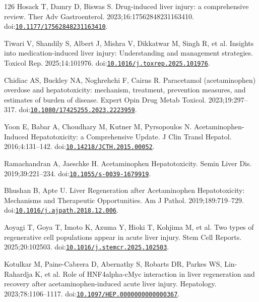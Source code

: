 \begingroup
\fontsize{8.6}{10.5}\selectfont
\begin{thebibliography}{126}
Hosack T, Damry D, Biswas S. Drug-induced liver injury: a comprehensive review. Ther Adv Gastroenterol. 2023;16:17562848231163410. doi:\href{https://doi.org/10.1177/17562848231163410}{\nolinkurl{10.1177/17562848231163410}}.

Tiwari V, Shandily S, Albert J, Mishra V, Dikkatwar M, Singh R, et al. Insights into medication-induced liver injury: Understanding and management strategies. Toxicol Rep. 2025;14:101976. doi:\href{https://doi.org/10.1016/j.toxrep.2025.101976}{\nolinkurl{10.1016/j.toxrep.2025.101976}}.

Chidiac AS, Buckley NA, Noghrehchi F, Cairns R. Paracetamol (acetaminophen) overdose and hepatotoxicity: mechanism, treatment, prevention measures, and estimates of burden of disease. Expert Opin Drug Metab Toxicol. 2023;19:297--317. doi:\href{https://doi.org/10.1080/17425255.2023.2223959}{\nolinkurl{10.1080/17425255.2023.2223959}}.

Yoon E, Babar A, Choudhary M, Kutner M, Pyrsopoulos N. Acetaminophen-Induced Hepatotoxicity: a Comprehensive Update. J Clin Transl Hepatol. 2016;4:131--142. doi:\href{https://doi.org/10.14218/JCTH.2015.00052}{\nolinkurl{10.14218/JCTH.2015.00052}}.

Ramachandran A, Jaeschke H. Acetaminophen Hepatotoxicity. Semin Liver Dis. 2019;39:221--234. doi:\href{https://doi.org/10.1055/s-0039-1679919}{\nolinkurl{10.1055/s-0039-1679919}}.

Bhushan B, Apte U. Liver Regeneration after Acetaminophen Hepatotoxicity: Mechanisms and Therapeutic Opportunities. Am J Pathol. 2019;189:719--729. doi:\href{https://doi.org/10.1016/j.ajpath.2018.12.006}{\nolinkurl{10.1016/j.ajpath.2018.12.006}}.

Aoyagi T, Goya T, Imoto K, Azuma Y, Hioki T, Kohjima M, et al. Two types of regenerative cell populations appear in acute liver injury. Stem Cell Reports. 2025;20:102503. doi:\href{https://doi.org/10.1016/j.stemcr.2025.102503}{\nolinkurl{10.1016/j.stemcr.2025.102503}}.

Kotulkar M, Paine-Cabrera D, Abernathy S, Robarts DR, Parkes WS, Lin-Rahardja K, et al. Role of HNF4alpha-cMyc interaction in liver regeneration and recovery after acetaminophen-induced acute liver injury. Hepatology. 2023;78:1106--1117. doi:\href{https://doi.org/10.1097/HEP.0000000000000367}{\nolinkurl{10.1097/HEP.0000000000000367}}.


\end{thebibliography}
